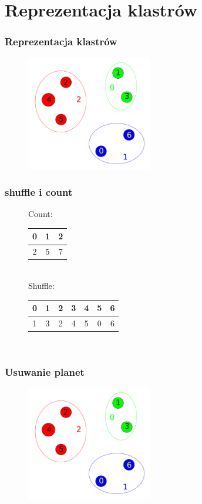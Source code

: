 \documentclass{beamer}
\begin{document}

\section{Reprezentacja klastrów}

\frame
{
	\frametitle{Reprezentacja klastrów}
	\begin{figure}
	\centering
		\includegraphics[height=5cm]{img/clusters.pdf}
	\end{figure}
	\setcounter{subfigure}{0}
}

\frame
{
	\frametitle{shuffle i count}
	\begin{figure}
		\centering
		Count: \\
		\begin{tabular}{|c|c|c|}
		\hline
		0 & 1 & 2 \\
		\hline
		2 & 5 & 7 \\
		\hline
		\end{tabular} \\
		\pause
		\vspace{1cm}
		Shuffle: \\
		\begin{tabular}{|c|c||c|c|c||c|c|}
		\hline
		0 & 1 & 2 & 3 & 4 & 5 & 6 \\
		\hline
		1 & 3 & 2 & 4 & 5 & 0 & 6 \\
		\hline
		\end{tabular} \\
	\end{figure}
}

\frame
{
	\frametitle{Usuwanie planet}
	\begin{figure}
		\centering
		\includegraphics[height=5cm]{img/clusters.pdf}
	\end{figure}
	\setcounter{subfigure}{0}
}
\end{document}
